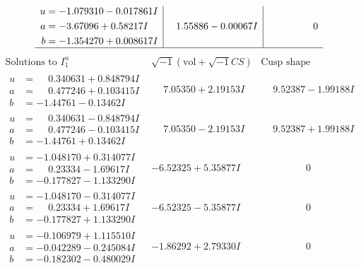 \documentclass[1p]{elsarticle_modified}
\theoremstyle{definition}
\newcommand{\I}{\sqrt{-1}}
\begin{document}
$$\begin{array}{c|c|c}
\begin{aligned}
u &= -1.079310 - 0.017861 I \\
a &= -3.67096 + 0.58217 I \\
b &= -1.354270 + 0.008617 I\end{aligned}
 & \phantom{-}1.55886 - 0.00067 I & \phantom{-0.000000 } 0\\
 \hline 
 \end{array}$$\newpage$$\begin{array}{c|c|c}  
\text{Solutions to }I^u_{1}& \I (\text{vol} + \sqrt{-1}CS) & \text{Cusp shape}\\
 \hline 
\begin{aligned}
u &= \phantom{-}0.340631 + 0.848794 I \\
a &= \phantom{-}0.477246 + 0.103415 I \\
b &= -1.44761 - 0.13462 I\end{aligned}
 & \phantom{-}7.05350 + 2.19153 I & \phantom{-}9.52387 - 1.99188 I \\ \hline\begin{aligned}
u &= \phantom{-}0.340631 - 0.848794 I \\
a &= \phantom{-}0.477246 - 0.103415 I \\
b &= -1.44761 + 0.13462 I\end{aligned}
 & \phantom{-}7.05350 - 2.19153 I & \phantom{-}9.52387 + 1.99188 I \\ \hline\begin{aligned}
u &= -1.048170 + 0.314077 I \\
a &= \phantom{-}0.23334 - 1.69617 I \\
b &= -0.177827 - 1.133290 I\end{aligned}
 & -6.52325 + 5.35877 I & \phantom{-0.000000 } 0 \\ \hline\begin{aligned}
u &= -1.048170 - 0.314077 I \\
a &= \phantom{-}0.23334 + 1.69617 I \\
b &= -0.177827 + 1.133290 I\end{aligned}
 & -6.52325 - 5.35877 I & \phantom{-0.000000 } 0 \\ \hline\begin{aligned}
u &= -0.106979 + 1.115510 I \\
a &= -0.042289 - 0.245084 I \\
b &= -0.182302 - 0.480029 I\end{aligned}
 & -1.86292 + 2.79330 I & \phantom{-0.000000 } 0 \\ \hline\begin{aligned}

\end{aligned}
\end{array}$$
\end{document}
